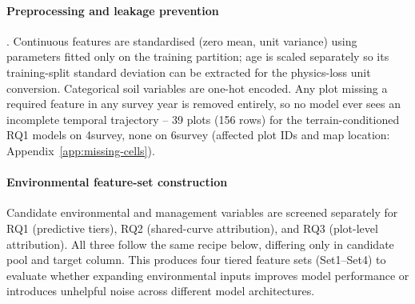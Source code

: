 \paragraph*{Preprocessing and leakage prevention}. Continuous features are standardised (zero mean, unit variance) using parameters fitted only on the training partition; age is scaled separately so its training-split standard deviation can be extracted for the physics-loss unit conversion. Categorical soil variables are one-hot encoded. Any plot missing a required feature in any survey year is removed entirely, so no model ever sees an incomplete temporal trajectory -- 39 plots (156 rows) for the terrain-conditioned RQ1 models on 4survey, none on 6survey (affected plot IDs and map location: Appendix~\ref{app:missing-cells}).


\paragraph*{Environmental feature-set construction}
\label{sec:feature-final}
Candidate environmental and management variables are screened separately for RQ1 (predictive tiers), RQ2 (shared-curve attribution), and RQ3 (plot-level attribution). All three follow the same recipe below, differing only in candidate pool and
target column. This produces four tiered feature sets (Set1–Set4) to evaluate whether expanding environmental inputs improves model performance or introduces unhelpful noise across different model architectures.


